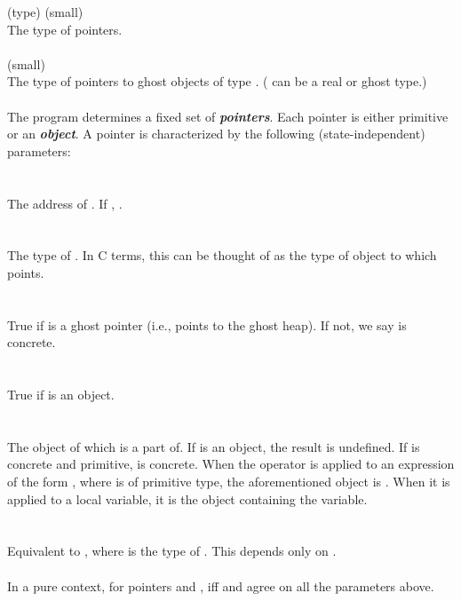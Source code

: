 \documentclass[preprint,nocopyrightspace]{sigplanconf}
\newcommand{\Def}[1]{\textit{\textbf{#1}}}
\begin{document}
{{\vcc{\object} (type) (small)\\
The type of pointers.
\\\\
 (small)\\
The type of pointers to ghost objects of type . ( can be a real or ghost type.)
\\\\
The program determines a fixed set of \Def{pointers}.  Each
pointer is either primitive or an \Def{object}. 
A pointer is characterized by the following (state-independent) parameters:
\\\\
\\
The address of . If , 
.
\\\\
\\
The type of . In C terms, this can be thought of as the type of
object to which  points.
\\\\
\\
True if  is a ghost pointer (i.e., points to the ghost
heap). If not, we say  is concrete. 
\\\\
\\
True if  is an object. 
\\\\
\\
The object of which  is a part of. If  is an object, the
result is undefined. If  is concrete and
primitive,  is concrete.
When the \vcc{&} operator is applied to an expression of the
form , where  is of primitive type, the
aforementioned object is . When it is applied to a local
variable, it is the object containing the variable.
\\\\
\\
Equivalent to , where  is the type
of . This depends only on . 
\\\\
In a pure context, for pointers  and , 
iff  and  agree on all the parameters above.
}}
\end{document}
